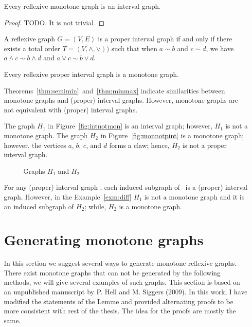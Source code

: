 \begin{lemma} \label{lem:intmon}
Every reflexive monotone graph is an interval graph.
\end{lemma}

\begin{proof}
TODO. It is not trivial.
\end{proof}

\begin{theorem} [TODO] \label{thm:minmax}
A reflexive graph \(G=(V,E)\) is a proper interval graph if and only if there exists
a total order \(T=(V,\wedge,\vee))\) such that
when \(a\sim b\) and \(c \sim d\), we have \(a \wedge c \sim b \wedge d\) and \(a \vee c \sim b \vee d\)\@.
\end{theorem}

\begin{cor} \label{cor:pintmon}
Every reflexive proper interval graph is a monotone graph.
\end{cor}

Theorems~\ref{thm:semimin}~and~\ref{thm:minmax} indicate similarities between
monotone graphs and (proper) interval graphs. However, monotone graphs are not
equivalent with (proper) interval graphs.

\begin{example} \label{exm:diff}
The graph \(H_1\) in Figure~\ref{fig:intnotmon} is 
an interval graph; however, \(H_1\) is not a monotone graph.
The graph \(H_2\) in Figure~\ref{fig:monnotpint} is a monotone graph;
however, the vertices \(a\), \(b\), \(c\), and \(d\) forms a claw; hence,
\(H_2\) is not a proper interval graph. 

\begin{figure}[h]
\hspace{2cm}
\subfigure[\ensuremath{H_1}]{\label{fig:intnotmon}}\hspace{4cm}
\subfigure[\ensuremath{H_2}]{\label{fig:monnotpint}}
\caption{Graphs \ensuremath{H_1} and \ensuremath{H_2}}
\end{figure}
\end{example}


For any (proper) interval graph \mH, each induced subgraph of \mH\ is a 
(proper) interval graph. However, in the Example~\ref{exm:diff} \(H_1\)
is not a monotone graph and it is an induced 
subgraph of \(H_2\); while, \(H_2\) is a monotone graph.

\section{Generating monotone graphs}
In this section we suggest several ways to generate monotone reflexive graphs.
There exist monotone graphs that can not be generated by the following methods,
we will give several examples of such graphs. This section is based on an unpublished
manuscript by P. Hell and M. Siggers (2009)\@. In this work, I have modified the
statements of the Lemme and provided alternating proofs to be more consistent with
rest of the thesis. The idea for the proofs are mostly the same.

